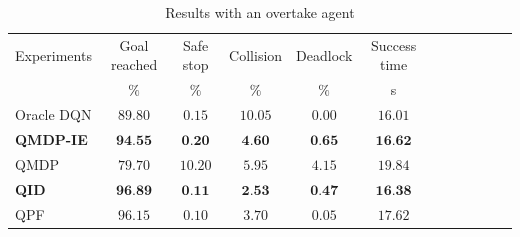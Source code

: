 \begin{table}
	\caption{Results with an overtake agent}
	\label{tab:theis_results_overtake}
	\begin{tabularx}{\columnwidth}{@{}l*{10}{c}c@{}}
	\toprule
	Experiments & Goal reached & Safe stop & Collision & Deadlock & Success time \\ 
			 & $\%$ & $\%$ & $\%$ & $\%$ & s \\ 
	\midrule
	Oracle DQN & $89.80$ & $0.15$ & $10.05$ & $0.00$ & $16.01$ \\ 
	\textbf{QMDP-IE} & $\textbf{94.55}$ & $\textbf{0.20}$ & $\textbf{4.60}$ & $\textbf{0.65}$ & $\textbf{16.62}$ \\ 
	QMDP & $79.70$ & $10.20$ & $5.95$ & $4.15$ & $19.84$ \\ 
	\textbf{QID} & $\textbf{96.89}$ & $\textbf{0.11}$ & $\textbf{2.53}$ & $\textbf{0.47}$ & $\textbf{16.38}$ \\ 
	QPF & $96.15$ & $0.10$ & $3.70$ & $0.05$ & $17.62$ \\ 
	\bottomrule
	\end{tabularx}
	\end{table}
% 			


% 			

